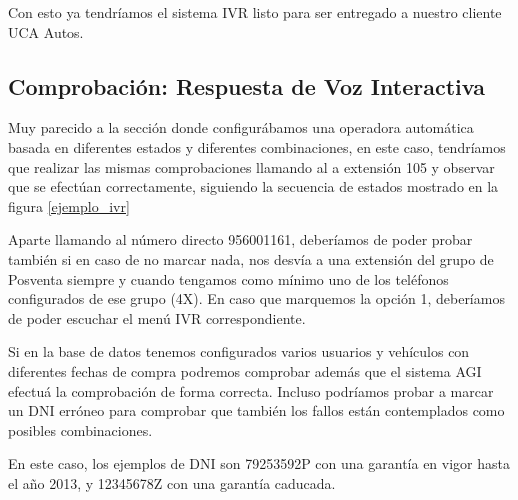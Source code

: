 Con esto ya tendríamos el sistema IVR listo para ser entregado a nuestro cliente UCA Autos.

\subsection{Comprobación: Respuesta de Voz Interactiva}

Muy parecido a la sección donde configurábamos una operadora automática basada en diferentes estados y diferentes combinaciones, en este caso, tendríamos que realizar las mismas comprobaciones llamando al a extensión 105 y observar que se efectúan correctamente, siguiendo la secuencia de estados mostrado en la figura \ref{ejemplo_ivr}

Aparte llamando al número directo 956001161, deberíamos de poder probar también si en caso de no marcar nada, nos desvía a una extensión del grupo de Posventa siempre y cuando tengamos como mínimo uno de los teléfonos configurados de ese grupo (4X). En caso que marquemos la opción 1, deberíamos de poder escuchar el menú IVR correspondiente.

Si en la base de datos tenemos configurados varios usuarios y vehículos con diferentes fechas de compra podremos comprobar además que el sistema AGI efectuá la comprobación de forma correcta. Incluso podríamos probar a marcar un DNI erróneo para comprobar que también los fallos están contemplados como posibles combinaciones.

En este caso, los ejemplos de DNI son 79253592P con una garantía en vigor hasta el año 2013, y 12345678Z con una garantía caducada.
